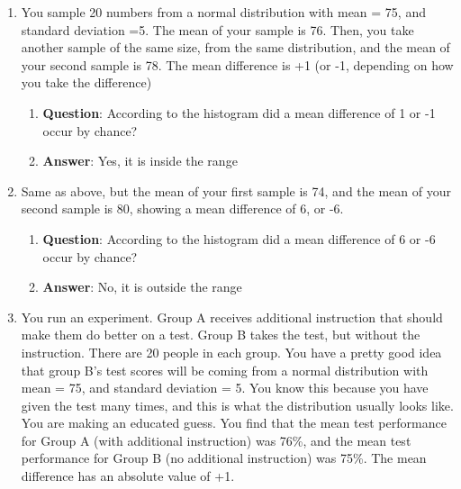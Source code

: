 \documentclass[]{book}
\providecommand{\tightlist}{%
  \setlength{\itemsep}{0pt}\setlength{\parskip}{0pt}}
\theoremstyle{definition}
\theoremstyle{definition}
\theoremstyle{definition}
\theoremstyle{remark}
\begin{document}
\begin{enumerate}
\def\labelenumi{\arabic{enumi}.}
\item
  You sample 20 numbers from a normal distribution with mean = 75, and
  standard deviation =5. The mean of your sample is 76. Then, you take
  another sample of the same size, from the same distribution, and the
  mean of your second sample is 78. The mean difference is +1 (or -1,
  depending on how you take the difference)

  \begin{enumerate}
  \def\labelenumii{\alph{enumii}.}
  \tightlist
  \item
    \textbf{Question}: According to the histogram did a mean difference
    of 1 or -1 occur by chance?
  \item
    \textbf{Answer}: Yes, it is inside the range
  \end{enumerate}
\item
  Same as above, but the mean of your first sample is 74, and the mean
  of your second sample is 80, showing a mean difference of 6, or -6.

  \begin{enumerate}
  \def\labelenumii{\alph{enumii}.}
  \tightlist
  \item
    \textbf{Question}: According to the histogram did a mean difference
    of 6 or -6 occur by chance?
  \item
    \textbf{Answer}: No, it is outside the range
  \end{enumerate}
\item
  You run an experiment. Group A receives additional instruction that
  should make them do better on a test. Group B takes the test, but
  without the instruction. There are 20 people in each group. You have a
  pretty good idea that group B's test scores will be coming from a
  normal distribution with mean = 75, and standard deviation = 5. You
  know this because you have given the test many times, and this is what
  the distribution usually looks like. You are making an educated guess.
  You find that the mean test performance for Group A (with additional
  instruction) was 76\%, and the mean test performance for Group B (no
  additional instruction) was 75\%. The mean difference has an absolute
  value of +1.


\end{enumerate}
\end{document}
